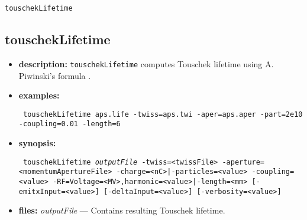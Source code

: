 \documentclass[11pt]{article}
\begin{document}
\begin{latexonly}
\newpage
\begin{center}{\Large\verb|touschekLifetime|}\end{center}
\end{latexonly}
\subsection{touschekLifetime}

\begin{itemize}

\item {\bf description:} \verb|touschekLifetime| computes Touschek lifetime using 
A. Piwinski's formula \cite{Piwinski, Xiao2007a}.

\item {\bf examples:}
\begin{flushleft}{\tt
touschekLifetime aps.life -twiss=aps.twi -aper=aps.aper -part=2e10 -coupling=0.01 -length=6
}\end{flushleft}

\item {\bf synopsis:}
\begin{flushleft}{\tt 
touschekLifetime {\em outputFile}
 -twiss=<twissFile> -aperture=<momentumApertureFile>
 {-charge=<nC>|-particles=<value>} -coupling=<value>
 {-RF=Voltage=<MV>,harmonic=<value>|-length=<mm>}
 [-emitxInput=<value>] [-deltaInput=<value>] [-verbosity=<value>]
}\end{flushleft}

\item {\bf files:}
{\em outputFile} --- Contains resulting Touschek lifetime.


\end{itemize}
\end{document}

